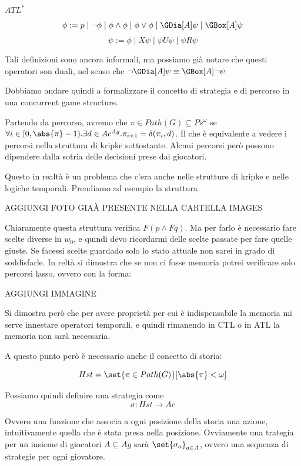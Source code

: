 \begin{definition}{\(ATL^*\)}
  \[\phi := p \mid \neg \phi \mid \phi \land \phi \mid \phi \lor \phi \mid \GDia[A]\psi \mid \GBox[A] \psi\]
  \[\psi := \phi \mid X\psi \mid \psi U\psi \mid \psi R \psi\]


\end{definition}

Tali definizioni sono ancora informali, ma possiamo già notare che questi operatori son duali, nel senso che \(\neg \GDia[A]\psi \equiv \GBox[A] \neg \psi\)

Dobbiamo andare quindi a formalizzare il concetto di strategia e di percorso in una concurrent game structure.

Partendo da percorso, avremo che \(\pi \in Path(G) \subseteq Ps^\omega\) se \(\forall i \in [0,\abs{\pi}-1). \exists d \in Ac^{Ag}. \pi_{i+1} = \delta(\pi_i,d)\). Il che è equivalente a vedere i percorsi nella struttura di kripke sottostante. Alcuni percorsi però possono dipendere dalla sotria delle decisioni prese dai giocatori.

Questo in realtà è un problema che c'era anche nelle strutture di kripke e nelle logiche temporali. Prendiamo ad esempio la struttura

AGGIUNGI FOTO GIAÀ PRESENTE NELLA CARTELLA IMAGES

Chiaramente questa struttura verifica \(F(p\land Fq)\). Ma per farlo è necessario fare scelte diverse in \(w_0\), e quindi devo ricordarmi delle scelte passate per fare quelle giuste. Se facessi scelte guardado solo lo stato attuale non sarei in grado di soddisfarle. In reltà si dimostra che se non ci fosse memoria potrei verificare solo percorsi lasso, ovvero con la forma:

AGGIUNGI IMMAGINE

Si dimostra però che per avere proprietà per cui è indispensabile la memoria mi serve innestare operatori temporali, e quindi rimanendo in CTL o in ATL la memoria non sarà necessaria.

A questo punto però è necessario anche il concetto di storia:

\[Hst = \set{\pi \in Path(G)}[\abs{\pi} < \omega]\]

Possiamo quindi definire una strategia come
\[\sigma: Hst \to Ac\]

Ovvero una funzione che associa a ogni posizione della storia una azione, intuitivamente quella che è stata presa nella posizione.
Ovviamente una trategia per un insieme di giocatori \(A\subseteq Ag\) sarà \(\set{\sigma_a}_{a \in A}\), ovvero una sequenza di strategie per ogni giovatore.

